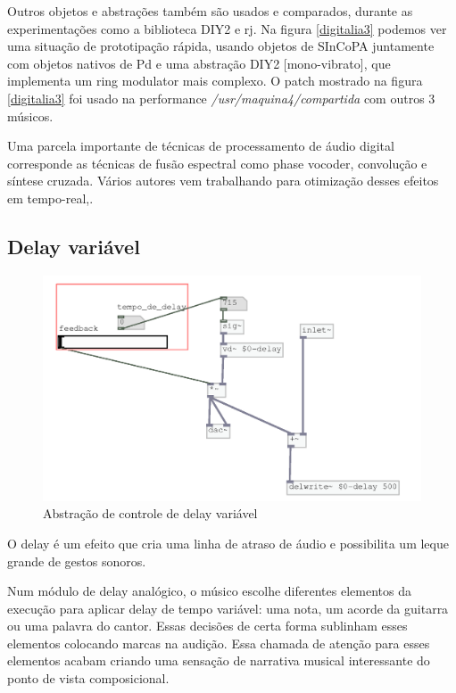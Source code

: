 \documentclass{ppgmus}
\begin{document}
Outros objetos e abstrações também são usados e comparados, durante as experimentações
como a biblioteca DIY2 e rj. Na figura \ref{digitalia3} podemos ver uma situação de prototipação
rápida, usando objetos de SInCoPA juntamente com objetos nativos de Pd e uma abstração DIY2 [mono-vibrato],
que implementa um ring modulator mais complexo. O patch mostrado na figura \ref{digitalia3} foi usado na
performance \textit{/usr/maquina4/compartida\texttildelow} com outros 3 músicos.

Uma parcela importante de técnicas de processamento de áudio digital corresponde as técnicas
de fusão espectral como phase vocoder, convolução e síntese cruzada. Vários autores vem trabalhando
para otimização desses efeitos em tempo-real\cite{porres},\cite{pd-tutorial}. 


\subsection{Delay variável}


\begin{figure}
\includegraphics[scale=.6]{sinc-delay}
\caption{Abstração de controle de delay variável}
\label{sinc-delay}
\end{figure}


O delay é um efeito que cria uma linha de atraso de áudio e possibilita
um leque grande de gestos sonoros.

Num módulo  de delay analógico, o músico escolhe diferentes elementos
da execução para aplicar delay de tempo variável: uma nota, um acorde 
da guitarra ou uma palavra do cantor. Essas decisões de certa forma 
sublinham esses elementos colocando marcas na audição. Essa chamada de
atenção para esses elementos acabam criando uma sensação de narrativa musical
interessante do ponto de vista composicional.
\end{document}
